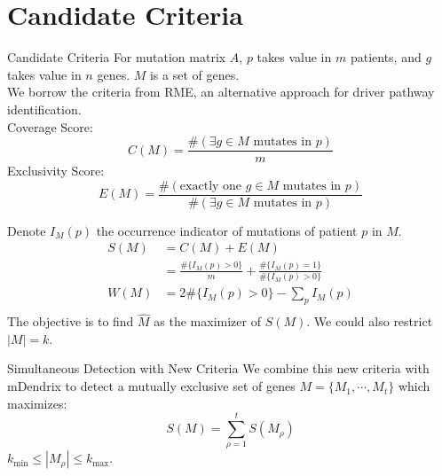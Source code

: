 \documentclass[xcolor=dvipsnames]{beamer}
\begin{document}
\section{Candidate Criteria}
\begin{frame}{Candidate Criteria}
For mutation matrix $A$, $p$ takes value in $m$ patients, and $g$ takes value in $n$ genes. $M$ is a set of genes.\\
We borrow the criteria from RME, an alternative approach for driver pathway identification.\\
Coverage Score:\\
\[C(M)=\frac{\#(\exists g\in M \text{ mutates in }p)}{m}\]
Exclusivity Score:\\
\[E(M)=\frac{\#(\text{exactly one } g\in M \text{ mutates in }p)}{\#(\exists g\in M \text{ mutates in }p)}\]
\end{frame}
\begin{frame}
Denote $I_M(p)$ the occurrence indicator of mutations of patient $p$ in $M$.\\
\begin{equation}
\begin{split}
S(M)&=C(M)+E(M)\\
&=\frac{\#\{I_M(p)>0\}}{m}+\frac{\#\{I_M(p)=1\}}{\#\{I_M(p)>0\}}\\
W(M)&=2\#\{I_M(p)>0\}-\sum_pI_M(p)\\
\end{split}
\end{equation}
The objective is to find $\hat{M}$ as the maximizer of $S(M)$. We could also restrict $|M|=k$.\\
\end{frame}
\begin{frame}{Simultaneous Detection with New Criteria}
We combine this new criteria with mDendrix to detect a mutually exclusive set of genes $M=\{M_1,\cdots,M_t\}$ which maximizes:
\[
S(M)=\sum_{\rho=1}^t S(M_{\rho})
\]
$k_{\min}\leqslant |M_{\rho}|\leqslant k_{\max}$.\\
\end{frame}
\end{document}
